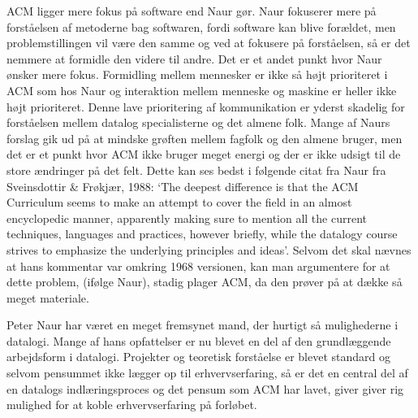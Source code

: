 ACM ligger mere fokus på software end Naur gør. Naur fokuserer mere på forståelsen af metoderne bag 
softwaren, fordi software kan blive forældet, men problemstillingen vil være den samme og ved at 
fokusere på forståelsen, så er det nemmere at formidle den videre til andre. Det er et andet punkt 
hvor Naur ønsker mere fokus. Formidling mellem mennesker er ikke så højt prioriteret i ACM som hos 
Naur og interaktion mellem menneske og maskine er heller ikke højt prioriteret. Denne lave prioritering 
af kommunikation er yderst skadelig for forståelsen mellem datalog specialisterne og det almene folk. 
Mange af Naurs forslag gik ud på at mindske grøften mellem fagfolk og den almene bruger, men det er et 
punkt hvor ACM ikke bruger meget energi og der er ikke udsigt til de store ændringer på det felt. 
Dette kan ses bedst i følgende citat fra Naur fra 
Sveinsdottir \& Frøkjær, 1988: `The deepest difference is that the ACM 
Curriculum seems to make an attempt to cover the field in an almost 
encyclopedic manner, apparently making sure to mention all the current 
techniques, languages and practices, however briefly, while the 
datalogy course strives to emphasize the underlying principles and ideas'. 
Selvom det skal nævnes at hans kommentar var omkring 1968 versionen, 
kan man argumentere for at dette problem, (ifølge Naur), stadig plager 
ACM, da den prøver på at dække så meget materiale.

Peter Naur har været en meget fremsynet mand, der hurtigt så mulighederne i datalogi. Mange af hans 
opfattelser er nu blevet en del af den grundlæggende arbejdsform i datalogi. Projekter og teoretisk 
forståelse er blevet standard og selvom pensummet ikke lægger op til erhvervserfaring, så er det en 
central del af en datalogs indlæringsproces og det pensum som ACM har lavet, giver giver rig mulighed 
for at koble erhvervserfaring på forløbet.
